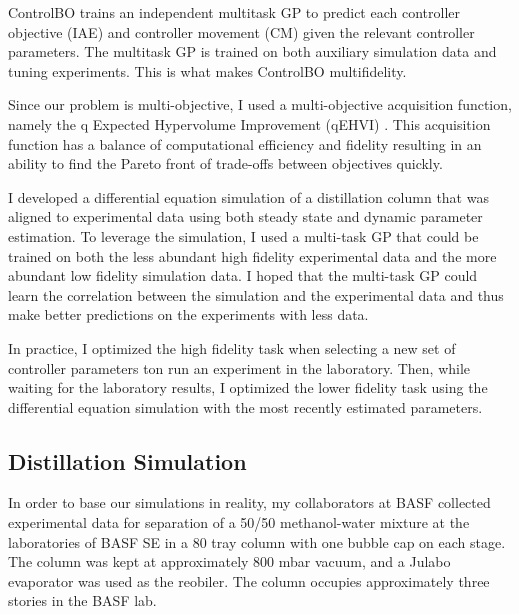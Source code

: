 ControlBO trains an independent multitask GP to predict each controller objective (IAE) and controller movement (CM) given the relevant controller parameters. The multitask GP is trained on both auxiliary simulation data and tuning experiments. This is what makes ControlBO multifidelity.

Since our problem is multi-objective, I used a multi-objective acquisition function, namely the q Expected Hypervolume Improvement (qEHVI) \cite{Balandat2020}. This acquisition function has a balance of computational efficiency and fidelity resulting in an ability to find the Pareto front of trade-offs between objectives quickly. 

I developed a differential equation simulation of a distillation column that was aligned to experimental data using both steady state and dynamic parameter estimation. To leverage the simulation, I used a multi-task GP that could be trained on both the less abundant high fidelity experimental data and the more abundant low fidelity simulation data. I hoped that the multi-task GP could learn the correlation between the simulation and the experimental data and thus make better predictions on the experiments with less data.



In practice, I optimized the high fidelity task when selecting  a new set of controller parameters ton run an experiment in the laboratory. Then, while waiting for the laboratory results, I optimized the lower fidelity task using the differential equation simulation with the most recently estimated parameters. 

\subsection{Distillation Simulation}\label{sec:distillation_model}

In order to base our simulations in reality, my collaborators at BASF collected experimental data for separation of a 50/50 methanol-water mixture at the laboratories of BASF SE in a 80 tray column with one bubble cap on each stage. The column was kept at approximately 800 mbar vacuum, and a Julabo evaporator was used as the reobiler. The column occupies approximately three stories in the BASF lab.  

